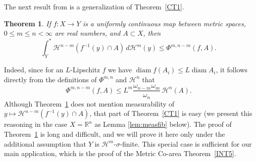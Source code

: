 \documentclass[12pt,leqno]{amsart}
\newtheorem{theorem}{Theorem}
\theoremstyle{definition}
\newcommand{\bbbr}{\mathbb R}
\def\diam{\operatorname{diam}}
\def\H{{\mathcal H}}
\numberwithin{theorem}{section} \numberwithin{equation}{section}
\begin{document}
The next result from \cite[Theorem~7.1]{EH1} is a generalization of Theorem~\ref{CT1}.
\begin{theorem}
\label{CT2}
If $f:X\to Y$ is a uniformly continuous map between metric spaces, $0\leq m\leq n<\infty$ are real numbers, and $A\subset X$, then
$$
\int_Y^* \H^{n-m}(f^{-1}(y)\cap A)\, d\H^m(y)\leq
\Phi^{m,n-m}(f,A).
$$
\end{theorem}
Indeed, since for an $L$-Lipschitz $f$ we have
$\diam f(A_i)\leq L\diam A_i$, it follows directly from the definitions of $\Phi^{m,n}$ and $\H^n$ that
\begin{equation}
\label{Ceq2}
\Phi^{m,n-m}(f,A)\leq L^m\frac{\omega_{n-m}\omega_m}{\omega_n}\, \H^n(A).
\end{equation}
Although Theorem~\ref{CT2} does not mention measurability of $y\mapsto \mathcal{H}^{n-m} \left(f^{-1}(y) \cap A\right)$, that part of Theorem~\ref{CT1} is easy (we present this reasoning in the case $X=\bbbr^n$ as Lemma \ref{lem:measfib} below).
The proof of Theorem~\ref{CT2} is long and difficult, and we will prove it here only under the additional assumption that $Y$ is $\H^m$-$\sigma$-finite. This special case is sufficient for our main application, which is the proof of the Metric Co-area Theorem~\ref{INT5}.
\end{document}
